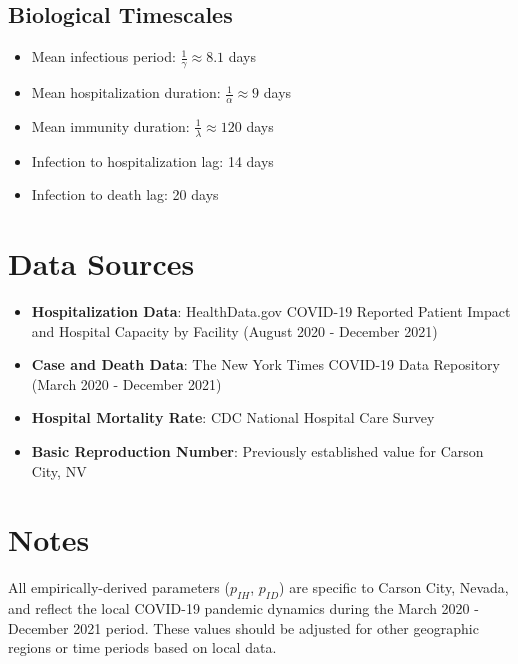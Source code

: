 \documentclass[11pt]{article}
\begin{document}
\subsection{Biological Timescales}
\begin{itemize}
    \item Mean infectious period: $\frac{1}{\gamma} \approx 8.1$ days
    \item Mean hospitalization duration: $\frac{1}{\alpha} \approx 9$ days
    \item Mean immunity duration: $\frac{1}{\lambda} \approx 120$ days
    \item Infection to hospitalization lag: 14 days
    \item Infection to death lag: 20 days
\end{itemize}

\section{Data Sources}

\begin{itemize}
    \item \textbf{Hospitalization Data}: HealthData.gov COVID-19 Reported Patient Impact and Hospital Capacity by Facility (August 2020 - December 2021)
    \item \textbf{Case and Death Data}: The New York Times COVID-19 Data Repository (March 2020 - December 2021)
    \item \textbf{Hospital Mortality Rate}: CDC National Hospital Care Survey
    \item \textbf{Basic Reproduction Number}: Previously established value for Carson City, NV
\end{itemize}

\section{Notes}

All empirically-derived parameters ($p_{IH}$, $p_{ID}$) are specific to Carson City, Nevada, and reflect the local COVID-19 pandemic dynamics during the March 2020 - December 2021 period. These values should be adjusted for other geographic regions or time periods based on local data.
\end{document}
